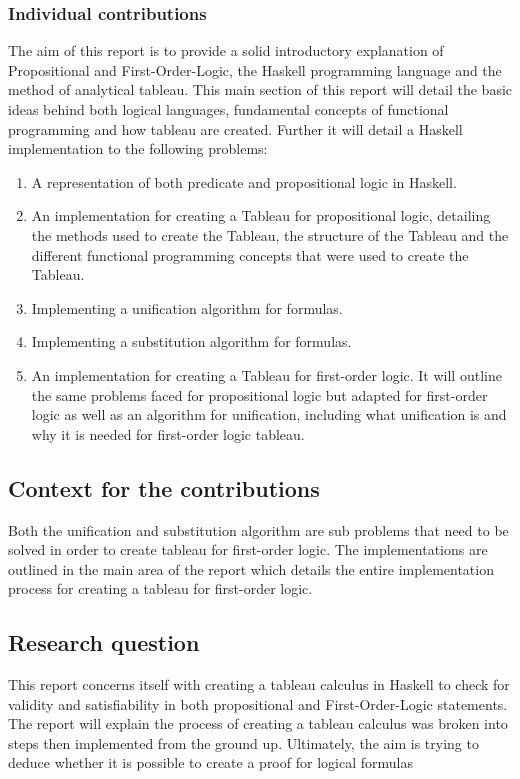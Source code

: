 \documentclass{article}%
\begin{document}
\subsubsection{Individual contributions}
The aim of this report is to provide a solid introductory explanation of Propositional and First-Order-Logic, the Haskell programming language and the method of analytical tableau. This main section of this report will detail the basic ideas behind both logical languages, fundamental concepts of functional programming and how tableau are created. Further it will detail a Haskell implementation to the following problems:
\begin{enumerate}
\item A representation of both predicate and propositional logic in Haskell.
\item An implementation for creating a Tableau for propositional logic, detailing the methods used to create the Tableau, the structure of the Tableau and the different functional programming concepts that were used to create the Tableau.
\item Implementing a unification algorithm for formulas.
\item Implementing a substitution algorithm for formulas.
\item An implementation for creating a Tableau for first-order logic. It will outline the same problems faced for propositional logic but adapted for first-order logic as well as an algorithm for unification, including what unification is and why it is needed for first-order logic tableau. 
\end{enumerate}
\subsection{Context for the contributions}
Both the unification and substitution algorithm are sub problems that need to be solved in order to create tableau for first-order logic. The implementations are outlined in the main area of the report which details the entire implementation process for creating a tableau for first-order logic. 


\subsection{Research question}
This report concerns itself with creating a tableau calculus in Haskell to check for validity and satisfiability in both propositional and First-Order-Logic statements. The report will explain  the process of creating a tableau calculus was broken into steps then implemented from the ground up. Ultimately, the aim is trying to deduce whether it is possible to create a proof for logical formulas
\end{document}
